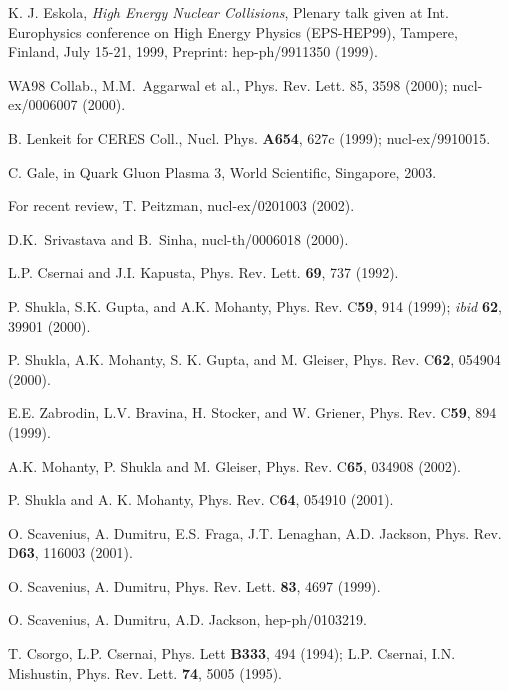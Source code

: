 \documentclass[aps,prc,preprint,superscriptaddress,showpacs,showkeys]{revtex4-1}
\begin{document}
\begin{thebibliography}{00}

 K. J. Eskola, {\it High Energy Nuclear Collisions}, 
  Plenary talk given at Int. Europhysics conference on High Energy Physics 
  (EPS-HEP99), Tampere, Finland, July 15-21, 1999, 
  Preprint: hep-ph/9911350 (1999).
  
 WA98 Collab., M.M.\ Aggarwal et al., 
            Phys. Rev. Lett. 85, 3598 (2000); nucl-ex/0006007 (2000).

 B. Lenkeit for CERES Coll., 
        Nucl. Phys. {\bf A654}, 627c (1999); nucl-ex/9910015.  
  
 C. Gale, in {Quark Gluon Plasma 3}, World Scientific,
         Singapore, 2003. 
         
 For recent review,  T. Peitzman, nucl-ex/0201003 (2002).

 D.K.\ Srivastava and B.\ Sinha, nucl-th/0006018 (2000).

 L.P. Csernai and J.I. Kapusta, Phys. Rev. Lett. {\bf 69},
               737 (1992).

 P. Shukla, S.K. Gupta, and A.K. Mohanty,
         Phys. Rev. C{\bf 59}, 914 (1999); {\it ibid} {\bf 62}, 39901 (2000).

 P. Shukla, A.K. Mohanty, S. K. Gupta, and M. Gleiser,
              Phys. Rev. C{\bf 62}, 054904 (2000).

 E.E. Zabrodin, L.V. Bravina, H. Stocker, and W. Griener,
         Phys. Rev. C{\bf 59}, 894 (1999).

 A.K. Mohanty, P. Shukla and M. Gleiser,
              Phys. Rev. C{\bf 65}, 034908 (2002).
              
 P. Shukla and A. K. Mohanty, Phys. Rev. C{\bf 64},
        054910 (2001).              

 O. Scavenius, A. Dumitru, E.S. Fraga, J.T. Lenaghan,
         A.D. Jackson, Phys. Rev. D{\bf 63}, 116003 (2001).

 O. Scavenius, A. Dumitru,
         Phys. Rev. Lett. {\bf 83}, 4697 (1999).
         
 O. Scavenius, A. Dumitru, A.D. Jackson, 
          hep-ph/0103219.
          
 T. Csorgo, L.P. Csernai, Phys. Lett {\bf B333}, 494 (1994);
       L.P. Csernai, I.N. Mishustin, Phys. Rev. Lett. {\bf 74}, 5005 (1995).
       

\end{thebibliography}
\end{document}
